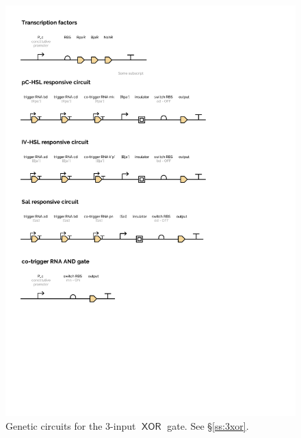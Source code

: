 \documentclass[12pt,notitlepage]{article}
\newcommand{\XOR}{\ensuremath{\mathop{\mathsf{XOR}}}\xspace}
\begin{document}
\begin{figure}[!p]
    \centering
    \includegraphics[height=(\textheight-2\baselineskip)]{images/xor_ribocomputing/plot-5.pdf}
    \caption{Genetic circuits for the 3-input \XOR gate. See \S\ref{ss:3xor}.}
    \label{f:p_construct_xor}
\end{figure}

\end{document}
